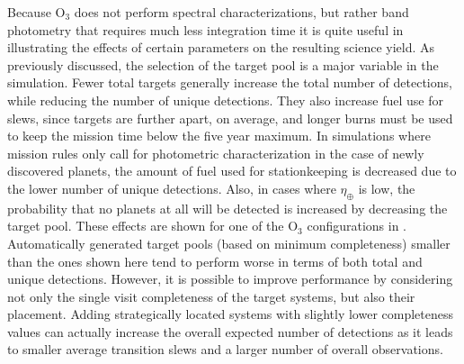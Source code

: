 Because O$_3$ does not perform spectral characterizations, but rather band photometry that requires much less integration time it is quite useful in illustrating the effects of certain parameters on the resulting science yield.  As previously discussed, the selection of the target pool is a major variable in the simulation.  Fewer total targets generally increase the total number of detections, while reducing the number of unique detections.  They also increase fuel use for slews, since targets are further apart, on average, and longer burns must be used to keep the mission time below the five year maximum.  In simulations where mission rules only call for photometric characterization in the case of newly discovered planets, the amount of fuel used for stationkeeping is decreased due to the lower number of unique detections. Also, in cases where $\eta_\oplus$ is low, the probability that no planets at all will be detected is increased by decreasing the target pool.  These effects are shown for one of the O$_3$ configurations in .  Automatically generated target pools (based on minimum completeness) smaller than the ones shown here tend to perform worse in terms of both total and unique detections.  However, it is possible to improve performance by considering not only the single visit completeness of the target systems, but also their placement.  Adding strategically located systems with slightly lower completeness values can actually increase the overall expected number of detections as it leads to smaller average transition slews and a larger number of overall observations.


